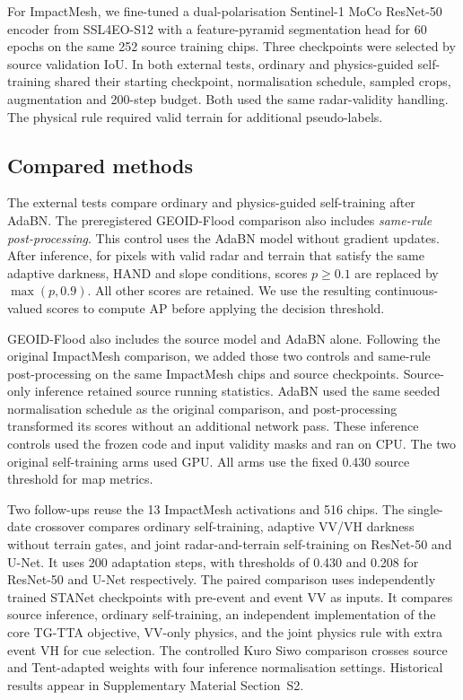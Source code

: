 \documentclass[a4paper,fleqn]{cas-sc}
\begin{document}
For ImpactMesh, we fine-tuned a dual-polarisation Sentinel-1 MoCo ResNet-50 encoder from SSL4EO-S12 \citep{wang2023ssl4eo} with a feature-pyramid segmentation head for 60 epochs on the same 252 source training chips. Three checkpoints were selected by source validation IoU. In both external tests, ordinary and physics-guided self-training shared their starting checkpoint, normalisation schedule, sampled crops, augmentation and 200-step budget. Both used the same radar-validity handling. The physical rule required valid terrain for additional pseudo-labels.

\subsection{Compared methods}
\label{sec:compared}
The external tests compare ordinary and physics-guided self-training after AdaBN. The preregistered GEOID-Flood comparison also includes \emph{same-rule post-processing}. This control uses the AdaBN model without gradient updates. After inference, for pixels with valid radar and terrain that satisfy the same adaptive darkness, HAND and slope conditions, scores $p\ge0.1$ are replaced by $\max(p,0.9)$. All other scores are retained. We use the resulting continuous-valued scores to compute AP before applying the decision threshold.

GEOID-Flood also includes the source model and AdaBN alone. Following the original ImpactMesh comparison, we added those two controls and same-rule post-processing on the same ImpactMesh chips and source checkpoints. Source-only inference retained source running statistics. AdaBN used the same seeded normalisation schedule as the original comparison, and post-processing transformed its scores without an additional network pass. These inference controls used the frozen code and input validity masks and ran on CPU. The two original self-training arms used GPU. All arms use the fixed 0.430 source threshold for map metrics.

Two follow-ups reuse the 13 ImpactMesh activations and 516 chips. The single-date crossover compares ordinary self-training, adaptive VV/VH darkness without terrain gates, and joint radar-and-terrain self-training on ResNet-50 and U-Net. It uses 200 adaptation steps, with thresholds of 0.430 and 0.208 for ResNet-50 and U-Net respectively. The paired comparison uses independently trained STANet checkpoints with pre-event and event VV as inputs. It compares source inference, ordinary self-training, an independent implementation of the core TG-TTA objective, VV-only physics, and the joint physics rule with extra event VH for cue selection. The controlled Kuro Siwo comparison crosses source and Tent-adapted weights with four inference normalisation settings. Historical results appear in Supplementary Material Section~S2.
\end{document}
